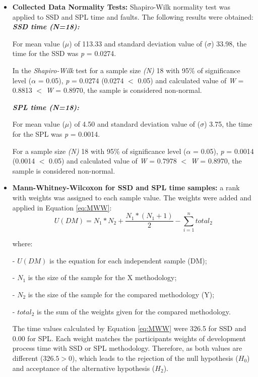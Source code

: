 \begin{itemize}
\setlength\itemsep{0.8em}

\item \textbf{Collected Data Normality Tests:} Shapiro-Wilk \cite{shaphirowilk65} normality test was applied to SSD and SPL time and faults. The following results were obtained:\\

\textbf{\textit{SSD time (\textit{N}=18):}}

For mean value ($\mu$) of 113.33 and standard deviation value of ($\sigma$) 33.98, the time for the SSD was \textit{p} = 0.0274.

In the \textit{Shapiro-Wilk} test for a sample size \textit{(N)} 18 with 95\% of significance level ($\alpha$ = 0.05), \textit{p} = 0.0274 (0.0274 $<$ 0.05) and calculated value of \textit{W} = 0.8813 $<$ \textit{W} = 0.8970, the sample is considered non-normal.

\textbf{\textit{SPL time (\textit{N}=18):}}

For mean value ($\mu$) of 4.50 and standard deviation value of ($\sigma$) 3.75, the time for the SPL was \textit{p} = 0.0014.

For a sample size \textit{(N)} 18 with 95\% of significance level ($\alpha$ = 0.05), \textit{p} = 0.0014 (0.0014 $<$ 0.05) and calculated value of \textit{W} = 0.7978 $<$ \textit{W} = 0.8970, the sample is considered non-normal.

\item \textbf{Mann-Whitney-Wilcoxon for SSD and SPL time samples:} a rank with weights was assigned to each sample value. The weights were added and applied in Equation \ref{eq:MWW}:
\small
\begin{equation}
\label{eq:MWW}
U(DM) = N_1 * N_2 + \frac{N_1*(N_1+1)}{2} - \sum_{i=1}^{n} total_{2}
\end{equation}
\normalsize 

where:

- \textit{$U(DM)$} is the equation for each independent sample (DM);

- \textit{$N_1$} is the size of the sample for the X methodology;

- \textit{$N_2$} is the size of the sample for the compared methodology (Y);

- \textit{$total_{2}$} is the sum of the weights given for the compared methodology.
\normalsize 
\vspace{5mm}

The time values calculated by Equation \ref{eq:MWW} were 326.5 for SSD and 0.00 for SPL. Each weight matches the participants weights of development process time with SSD or SPL methodology. Therefore, as both values are different ($326.5>0$), which leads to the rejection of the null hypothesis ($H_0$) and acceptance of the alternative hypothesis ($H_{2}$).


\end{itemize}
